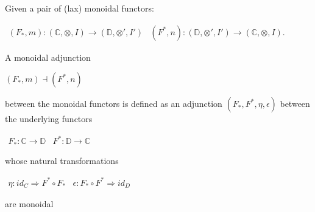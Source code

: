 \begin{definition}
\label{def:monoidal_adjunction}
    Given a pair of (lax) monoidal functors:
    \begin{center}
        \begin{math}
            \begin{array}{lr}
                (F_*,m) : (\mathbb{C}, \otimes, I) \rightarrow (\mathbb{D}, \otimes ' , I')
                &
                (F^*, n) : (\mathbb{D}, \otimes ', I') \rightarrow (\mathbb{C},\otimes,I).
            \end{array}
        \end{math}
    \end{center}
    A monoidal adjunction
    \begin{center}
        \begin{math}
            (F_*,m) \dashv (F^*, n)
        \end{math}
    \end{center}
    between the monoidal functors is defined as an adjunction $(F_*,F^*,\eta,\epsilon)$ between the underlying functors
    \begin{center}
        \begin{math}
            \begin{array}{lr}
                F_* : \mathbb{C} \rightarrow \mathbb{D}
                &
                F^* : \mathbb{D} \rightarrow \mathbb{C}
            \end{array}
        \end{math}
    \end{center}
    whose natural transformations 
    \begin{center}
        \begin{math}
            \begin{array}{lr}
                \eta : id_C \Rightarrow F^* \circ F_* & \epsilon : F_* \circ F^* \Rightarrow id_D
            \end{array}
        \end{math}
    \end{center}
    are monoidal \cite{mellies2009}
\end{definition}